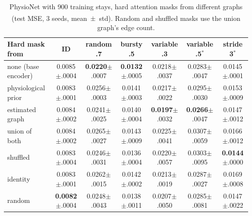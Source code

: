 \documentclass[sigconf,nonacm]{acmart}
\newcommand{\prelim}{\textsuperscript{\dag}}
\begin{document}
\begin{table}[t]
\caption{PhysioNet with 900 training stays, hard attention masks from different graphs (test MSE\prelim, 3 seeds,
mean~$\pm$~std). Random and shuffled masks use the union graph's edge count.}
\label{tab:physlow}
\small
\begin{tabular}{lcccccc}
\toprule
Hard mask from & ID & random .7 & bursty .5 & variable .3 & variable .5$^*$ & stride 3$^*$ \\
\midrule
none (base encoder) & 0.0085$\pm$.0004 & \textbf{0.0220}$\pm$.0007 & \textbf{0.0132}$\pm$.0005 & 0.0218$\pm$.0037 & 0.0283$\pm$.0047 & 0.0145$\pm$.0001 \\
physiological prior & 0.0083$\pm$.0001 & 0.0256$\pm$.0003 & 0.0141$\pm$.0003 & 0.0217$\pm$.0022 & 0.0295$\pm$.0030 & 0.0153$\pm$.0009 \\
estimated graph & 0.0084$\pm$.0002 & 0.0241$\pm$.0025 & 0.0140$\pm$.0004 & \textbf{0.0197}$\pm$.0032 & \textbf{0.0266}$\pm$.0047 & 0.0147$\pm$.0012 \\
union of both & 0.0084$\pm$.0002 & 0.0265$\pm$.0027 & 0.0143$\pm$.0009 & 0.0225$\pm$.0041 & 0.0307$\pm$.0059 & 0.0166$\pm$.0012 \\
shuffled & 0.0083$\pm$.0004 & 0.0246$\pm$.0031 & 0.0136$\pm$.0004 & 0.0220$\pm$.0057 & 0.0303$\pm$.0095 & \textbf{0.0144}$\pm$.0000 \\
identity & 0.0083$\pm$.0001 & 0.0262$\pm$.0015 & 0.0142$\pm$.0002 & 0.0213$\pm$.0019 & 0.0287$\pm$.0027 & 0.0169$\pm$.0008 \\
random & \textbf{0.0082}$\pm$.0004 & 0.0248$\pm$.0043 & 0.0138$\pm$.0011 & 0.0207$\pm$.0050 & 0.0285$\pm$.0081 & 0.0147$\pm$.0022 \\
\bottomrule
\end{tabular}
\end{table}
\end{document}
